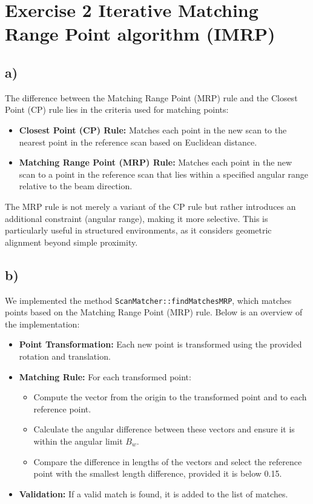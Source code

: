 \documentclass[template,12pt,a4paper,enabledeprecatedfontcommands]{template}
\begin{document}
\section{Exercise 2 Iterative Matching Range Point algorithm (IMRP)}

\subsection{a)}

The difference between the Matching Range Point (MRP) rule and the Closest Point (CP) rule lies in the criteria used for matching points:

\begin{itemize}
    \item \textbf{Closest Point (CP) Rule:} Matches each point in the new scan to the nearest point in the reference scan based on Euclidean distance.
    \item \textbf{Matching Range Point (MRP) Rule:} Matches each point in the new scan to a point in the reference scan that lies within a specified angular range relative to the beam direction.

\end{itemize}

The MRP rule is not merely a variant of the CP rule but rather introduces an additional constraint (angular range), making it more selective. This is particularly useful in structured environments, as it considers geometric alignment beyond simple proximity.


\subsection{b)}

We implemented the method \texttt{ScanMatcher::findMatchesMRP}, which matches points based on the Matching Range Point (MRP) rule. Below is an overview of the implementation:

\begin{itemize}
    \item \textbf{Point Transformation:} Each new point is transformed using the provided rotation and translation.
    \item \textbf{Matching Rule:} For each transformed point:
    \begin{itemize}
        \item Compute the vector from the origin to the transformed point and to each reference point.
        \item Calculate the angular difference between these vectors and ensure it is within the angular limit \(B_w\).
        \item Compare the difference in lengths of the vectors and select the reference point with the smallest length difference, provided it is below 0.15.
    \end{itemize}
    \item \textbf{Validation:} If a valid match is found, it is added to the list of matches.
\end{itemize}
\end{document}
